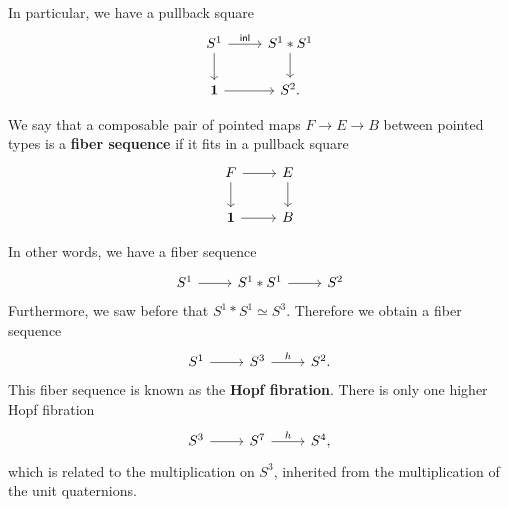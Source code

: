\documentclass[handout]{beamer}
\newcommand{\unit}{\mathbf{1}}
\newcommand{\sphere}[1]{S^{#1}}
\newcommand{\inl}{\mathsf{inl}}
\begin{document}
\begin{frame}
  In particular, we have a pullback square
  \begin{equation*}
    \begin{tikzcd}[ampersand replacement=\&]
      \sphere{1} \arrow[r,"\inl"] \arrow[d] \& \sphere{1}\ast\sphere{1} \arrow[d] \\
      \unit \arrow[r] \& \sphere{2}.
    \end{tikzcd}
  \end{equation*}

  \begin{definition}
    We say that a composable pair of pointed maps $F\to E\to B$ between pointed types is a \textbf{fiber sequence} if it fits in a pullback square
    \begin{equation*}
      \begin{tikzcd}[ampersand replacement=\&]
        F \arrow[d] \arrow[r] \& E \arrow[d] \\
        \unit \arrow[r] \& B
      \end{tikzcd}
    \end{equation*}
  \end{definition}
\end{frame}

\begin{frame}
  In other words, we have a fiber sequence
  \begin{equation*}
    \begin{tikzcd}[ampersand replacement=\&]
      \sphere{1} \arrow[r] \& \sphere{1}\ast\sphere{1} \arrow[r] \& \sphere{2}
    \end{tikzcd}
  \end{equation*}
  Furthermore, we saw before that $\sphere{1}\ast\sphere{1}\simeq\sphere{3}$. Therefore we obtain a fiber sequence
  \begin{equation*}
    \begin{tikzcd}[ampersand replacement=\&]
      \sphere{1} \arrow[r] \& \sphere{3} \arrow[r,"h"] \& \sphere{2}.
    \end{tikzcd}
  \end{equation*}
  This fiber sequence is known as the \textbf{Hopf fibration}. There is only one higher Hopf fibration
  \begin{equation*}
    \begin{tikzcd}[ampersand replacement=\&]
      \sphere{3} \arrow[r] \& \sphere{7} \arrow[r,"h"] \& \sphere{4},
    \end{tikzcd}
  \end{equation*}
  which is related to the multiplication on $\sphere{3}$, inherited from the multiplication of the unit quaternions.
\end{frame}
\end{document}
